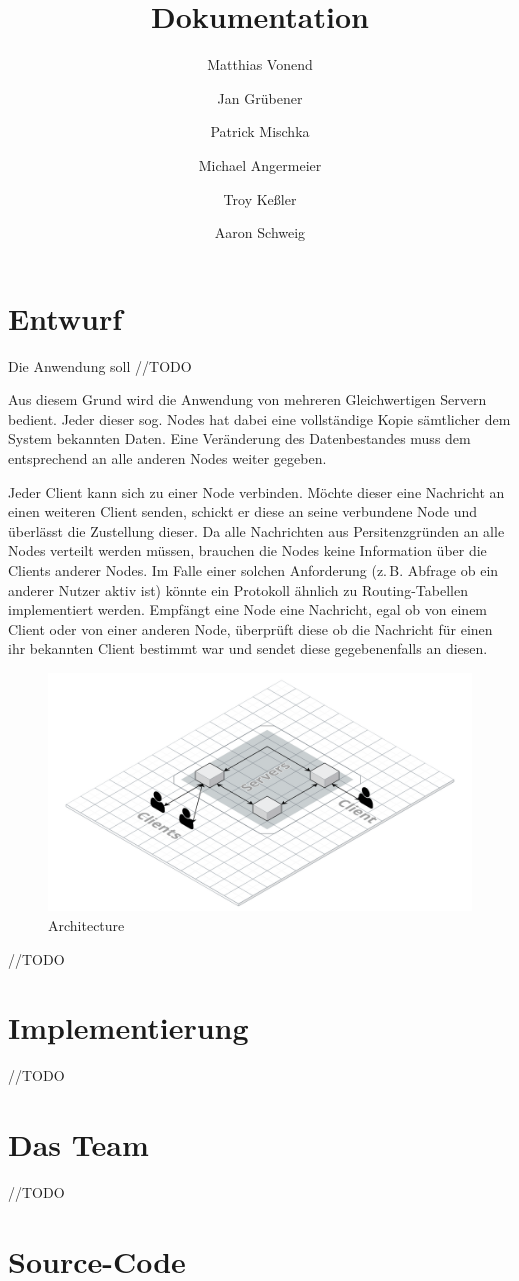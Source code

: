 \documentclass[a4paper]{article}
\title{Dokumentation}
\author{
    Matthias Vonend
    \and
    Jan Grübener
    \and
    Patrick Mischka
    \and
    Michael Angermeier
    \and
    Troy Keßler
    \and
    Aaron Schweig
    \and
}
\theoremstyle{definition}
\begin{document}
    \maketitle

   

    \section{Entwurf}
    Die Anwendung soll //TODO

    Aus diesem Grund wird die Anwendung von mehreren Gleichwertigen Servern bedient. Jeder dieser sog. Nodes hat dabei eine vollständige Kopie sämtlicher dem System bekannten Daten. Eine Veränderung des Datenbestandes muss dem entsprechend an alle anderen Nodes weiter gegeben.

    Jeder Client kann sich zu einer Node verbinden. Möchte dieser eine Nachricht an einen weiteren Client senden, schickt er diese an seine verbundene Node und überlässt die Zustellung dieser. Da alle Nachrichten aus Persitenzgründen an alle Nodes verteilt werden müssen, brauchen die Nodes keine Information über die Clients anderer Nodes. Im Falle einer solchen Anforderung (z.\,B. Abfrage ob ein anderer Nutzer aktiv ist) könnte ein Protokoll ähnlich zu Routing-Tabellen implementiert werden. Empfängt eine Node eine Nachricht, egal ob von einem Client oder von einer anderen Node, überprüft diese ob die Nachricht für einen ihr bekannten Client bestimmt war und sendet diese gegebenenfalls an diesen.

    \begin{figure}[h]
        \centering
        \includegraphics[width=\textwidth]{architecture.png}
        
        \caption{Architecture}
        \label{}
    \end{figure}

    //TODO

    \section{Implementierung}
    //TODO

    \section{Das Team}
    //TODO

    \clearpage
    \section{Source-Code}
    
\end{document}
